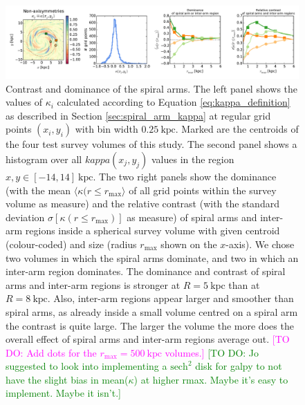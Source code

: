 \documentclass[iop,revtex4,numberedappendix,appendixfloats]{emulateapj}
\newcommand{\Wilma}[1]{\textcolor{Magenta}{#1}}
\newcommand{\HW}[1]{\textcolor{Green}{#1}}
\begin{document}
\begin{figure}[!htbp]
\centering
\includegraphics[width=\textwidth]{fig/whole_galaxy_kappa_i.pdf}
\caption{Contrast and dominance of the spiral arms. The left panel shows the values of $\kappa_i$ calculated according to Equation \ref{eq:kappa_definition} as described in Section \ref{sec:spiral_arm_kappa} at regular grid points $(x_i,y_i)$ with bin width $0.25~\text{kpc}$. Marked are the centroids of the four test survey volumes of this study. The second panel shows a histogram over all $kappa(x_j,y_j)$ values in the region $x,y \in [-14,14]~\text{kpc}$. The two right panels show the dominance (with the mean $\langle \kappa (r \leq r_\text{max} \rangle$ of all grid points within the survey volume as measure) and the relative contrast (with the standard deviation $\sigma[\kappa (r \leq r_\text{max})]$ as measure) of spiral arms and inter-arm regions inside a spherical survey volume with given centroid (colour-coded) and size (radius $r_\text{max}$ shown on the $x$-axis). We chose two volumes in which the spiral arms dominate, and two in which an inter-arm region dominates. The dominance and contrast of spiral arms and inter-arm regions is stronger at $R=5~\text{kpc}$ than at $R=8~\text{kpc}$. Also, inter-arm regions appear larger and smoother than spiral arms, as already inside a small volume centred on a spiral arm the contrast is quite large. The larger the volume the more does the overall effect of spiral arms and inter-arm regions average out. \Wilma{[TO DO: Add dots for the $r_\text{max}=500~\text{kpc}$ volumes.]} \HW{[TO DO: Jo suggested to look into implementing a $\text{sech}^2$ disk for galpy to not have the slight bias in mean($\kappa$) at higher rmax. Maybe it's easy to implement. Maybe it isn't.]}}
\label{fig:spiral_arm_kappa}
\end{figure}


\end{document}
